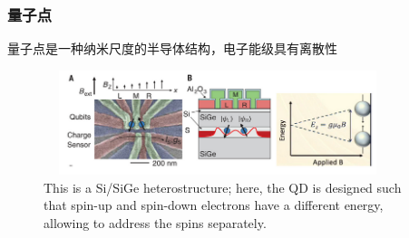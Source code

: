\begin{frame}
    \frametitle{量子点}
        量子点是一种纳米尺度的半导体结构，电子能级具有离散性\\
	{\fontsize{8.5pt}{5.2pt}\selectfont{通过控制量子点中的电子数量和能级结构，可以实现对量子态的精确调控}}
    \begin{figure}
        \centering
                \includegraphics[height=1.2in, width=4.0in, viewport=0 0 720 237,clip]{Figures/Si_SiGe-heterostructure_QD-spin_up-and-spin_down-electrons-have-a-different-energy.png}
		\caption{\tiny{\textrm{This is a Si/SiGe heterostructure; here, the QD is designed such that spin-up and spin-down electrons have a different energy, allowing to address the spins separately.}}}
		\label{Fig:Si_SiGe-heterostructure_QD-spin_up-and-spin_down-electrons-have-a-different-energy}
    \end{figure}
       	    \vskip -10pt
	    {\fontsize{9.5pt}{5.2pt}\selectfont{在半导体量子计算中，量子点可作为量子比特的载体，用于生成和处理量子信息}}
\end{frame}

